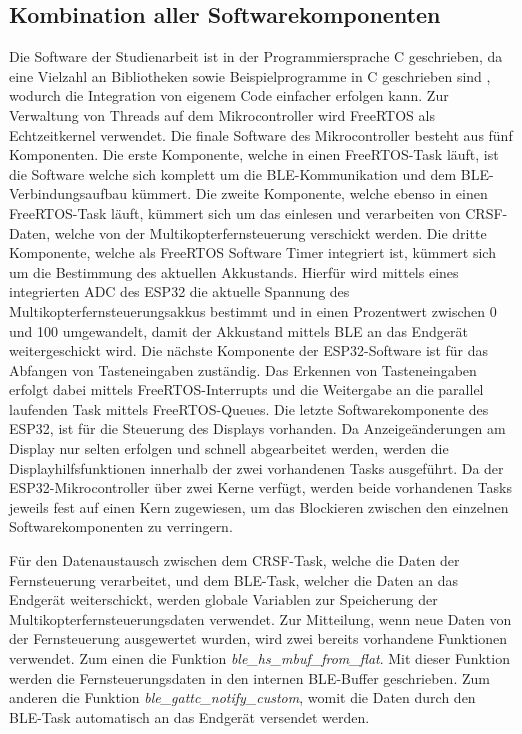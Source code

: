 \subsection{Kombination aller Softwarekomponenten}
Die Software der Studienarbeit ist in der Programmiersprache C geschrieben, da eine Vielzahl an Bibliotheken sowie Beispielprogramme in C geschrieben sind \cite{espressifIDF}, wodurch die Integration von eigenem Code einfacher erfolgen kann. Zur Verwaltung von Threads auf dem Mikrocontroller wird FreeRTOS als Echtzeitkernel verwendet. Die finale Software des Mikrocontroller besteht aus fünf Komponenten. Die erste Komponente, welche in einen FreeRTOS-Task läuft, ist die Software welche sich komplett um die \ac{BLE}-Kommunikation und dem \ac{BLE}-Verbindungsaufbau kümmert. Die zweite Komponente, welche ebenso in einen FreeRTOS-Task läuft, kümmert sich um das einlesen und verarbeiten von CRSF-Daten, welche von der Multikopterfernsteuerung verschickt werden. Die dritte Komponente, welche als FreeRTOS Software Timer integriert ist, kümmert sich um die Bestimmung des aktuellen Akkustands. Hierfür wird mittels eines integrierten \ac{ADC} des ESP32 die aktuelle Spannung des Multikopterfernsteuerungsakkus bestimmt und in einen Prozentwert zwischen 0 und 100 umgewandelt, damit der Akkustand mittels \ac{BLE} an das Endgerät weitergeschickt wird. Die nächste Komponente der ESP32-Software ist für das Abfangen von Tasteneingaben zuständig. Das Erkennen von Tasteneingaben erfolgt dabei mittels FreeRTOS-Interrupts und die Weitergabe an die parallel laufenden Task mittels FreeRTOS-Queues. Die letzte Softwarekomponente des ESP32, ist für die Steuerung des Displays vorhanden. Da Anzeigeänderungen am Display nur selten erfolgen und schnell abgearbeitet werden, werden die Displayhilfsfunktionen innerhalb der zwei vorhandenen Tasks ausgeführt. Da der ESP32-Mikrocontroller über zwei Kerne verfügt, werden beide vorhandenen Tasks jeweils fest auf einen Kern zugewiesen, um das Blockieren zwischen den einzelnen Softwarekomponenten zu verringern.

Für den Datenaustausch zwischen dem CRSF-Task, welche die Daten der Fernsteuerung verarbeitet, und dem \ac{BLE}-Task, welcher die Daten an das Endgerät weiterschickt, werden globale Variablen zur Speicherung der Multikopterfernsteuerungsdaten verwendet. Zur Mitteilung, wenn neue Daten von der Fernsteuerung ausgewertet wurden, wird zwei bereits vorhandene Funktionen verwendet. Zum einen die Funktion \textit{ble\_hs\_mbuf\_from\_flat}. Mit dieser Funktion werden die Fernsteuerungsdaten in den internen \ac{BLE}-Buffer geschrieben. Zum anderen die Funktion \textit{ble\_gattc\_notify\_custom}, womit die Daten durch den \ac{BLE}-Task automatisch an das Endgerät versendet werden.

